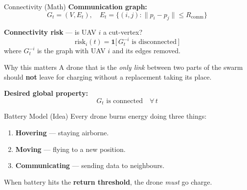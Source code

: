 \documentclass[aspectratio=169,12pt]{beamer}
\begin{document}
\begin{frame}{Connectivity (Math)}
\textbf{Communication graph:}
\[
G_t = (V, E_t),
\quad
E_t = \bigl\{(i,j) : \|p_i - p_j\| \le R_{\text{comm}}\bigr\}
\]

\vspace{0.4em}
\textbf{Connectivity risk} --- is UAV $i$ a cut-vertex?
\[
\text{risk}_i(t) = \mathbf{1}\!\bigl[\,G_t^{-i} \text{ is disconnected}\,\bigr]
\]
where $G_t^{-i}$ is the graph with UAV $i$ and its edges removed.

\vspace{0.4em}
\begin{block}{Why this matters}
A drone that is the \emph{only link} between two parts of the swarm
should \textbf{not} leave for charging without a replacement taking its place.
\end{block}

\vspace{0.3em}
\textbf{Desired global property:}
\[
G_t \text{ is connected} \quad \forall\, t
\]
\end{frame}


\begin{frame}{Battery Model (Idea)}
Every drone burns energy doing three things:

\begin{enumerate}
    \item \textbf{Hovering} --- staying airborne.
    \item \textbf{Moving} --- flying to a new position.
    \item \textbf{Communicating} --- sending data to neighbours.
\end{enumerate}

\vspace{0.4em}
\begin{center}
\end{center}

When battery hits the \textbf{return threshold}, the drone \emph{must} go charge.
\end{frame}
\end{document}
